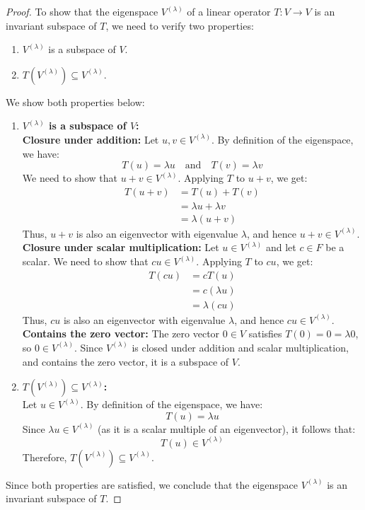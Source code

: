 \documentclass[openany]{book}
\begin{document}
\begin{proof}
To show that the eigenspace $V^{(\lambda)}$ of a linear operator $T: V \to V$ is an invariant subspace of $T$, we need to verify two properties:
\begin{enumerate}
\item $V^{(\lambda)}$ is a subspace of $V$.
\item $T(V^{(\lambda)}) \subseteq V^{(\lambda)}$.
\end{enumerate}
We show both properties below:
\begin{enumerate}
    \item \textbf{$V^{(\lambda)}$ is a subspace of $V$:} \\
    \textbf{Closure under addition:} Let $u, v \in V^{(\lambda)}$. By definition of the eigenspace, we have:
    $$T(u) = \lambda u \quad \text{and} \quad T(v) = \lambda v$$
    We need to show that $u + v \in V^{(\lambda)}$. Applying $T$ to $u + v$, we get:
    \[\begin{aligned}
    T(u + v) &= T(u) + T(v) \\
    &= \lambda u + \lambda v \\
    &= \lambda (u + v)
    \end{aligned}\]
    Thus, $u + v$ is also an eigenvector with eigenvalue $\lambda$, and hence $u + v \in V^{(\lambda)}$. \\
    \textbf{Closure under scalar multiplication:} Let $u \in V^{(\lambda)}$ and let $c \in F$ be a scalar. We need to show that $cu \in V^{(\lambda)}$. Applying $T$ to $cu$, we get:
    \[\begin{aligned}
    T(cu) &= cT(u) \\
    &= c(\lambda u) \\
    &= \lambda (cu)
    \end{aligned}\]
    Thus, $cu$ is also an eigenvector with eigenvalue $\lambda$, and hence $cu \in V^{(\lambda)}$. \\ 
    \textbf{Contains the zero vector:} The zero vector $0 \in V$ satisfies $T(0) = 0 = \lambda 0$, so $0 \in V^{(\lambda)}$.
    Since $V^{(\lambda)}$ is closed under addition and scalar multiplication, and contains the zero vector, it is a subspace of $V$.
    \item \textbf{$T(V^{(\lambda)}) \subseteq V^{(\lambda)}$:} \\ 
    Let $u \in V^{(\lambda)}$. By definition of the eigenspace, we have:
    $$T(u) = \lambda u$$
    Since $\lambda u \in V^{(\lambda)}$ (as it is a scalar multiple of an eigenvector), it follows that:
    $$T(u) \in V^{(\lambda)}$$
    Therefore, $T(V^{(\lambda)}) \subseteq V^{(\lambda)}$.
\end{enumerate}
Since both properties are satisfied, we conclude that the eigenspace $V^{(\lambda)}$ is an invariant subspace of $T$.
\end{proof}
\end{document}
